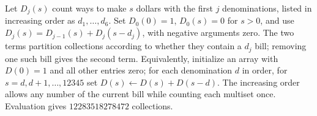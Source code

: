Let $D_j(s)$ count ways to make $s$ dollars with the first $j$ denominations, listed in increasing order as $d_1,\ldots,d_6$. Set $D_0(0)=1$, $D_0(s)=0$ for $s>0$, and use $D_j(s)=D_{j-1}(s)+D_j(s-d_j)$, with negative arguments zero. The two terms partition collections according to whether they contain a $d_j$ bill; removing one such bill gives the second term. Equivalently, initialize an array with $D(0)=1$ and all other entries zero; for each denomination $d$ in order, for $s=d,d+1,\ldots,12345$ set $D(s)\leftarrow D(s)+D(s-d)$. The increasing order allows any number of the current bill while counting each multiset once. Evaluation gives $\boxed{12283518278472}$ collections.
